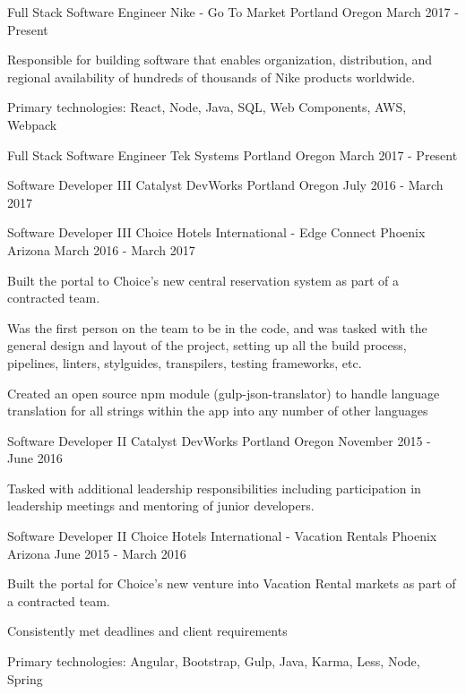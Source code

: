 
\begin{cventries}

  \cventry
  {Full Stack Software Engineer}
  {Nike - Go To Market}
  {Portland Oregon}
  {March 2017 - Present}
  {
    \begin{cvitems}
      \item {Responsible for building software that enables organization, distribution, and regional availability of hundreds of thousands of Nike products worldwide.}
      \item {Primary technologies: React, Node, Java, SQL, Web Components, AWS, Webpack}
    \end{cvitems}
  }

  \cventry
  {Full Stack Software Engineer}
  {Tek Systems}
  {Portland Oregon}
  {March 2017 - Present}
  {}

  \cventry
  {Software Developer III}
  {Catalyst DevWorks}
  {Portland Oregon}
  {July 2016 - March 2017}
  {}

  \cventry
    {Software Developer III}
    {Choice Hotels International - Edge Connect}
    {Phoenix Arizona}
    {March 2016 - March 2017}
    {
      \begin{cvitems}
        \item {Built the portal to Choice's new central reservation system as part of a contracted team.}
        \item {Was the first person on the team to be in the code, and was tasked with the general design and layout of the project, setting up all the build process, pipelines, linters, stylguides, transpilers, testing frameworks, etc.}
        \item {Created an open source npm module (gulp-json-translator) to handle language translation for all strings within the app into any number of other languages}
      \end{cvitems}
    }

  \cventry
    {Software Developer II}
    {Catalyst DevWorks}
    {Portland Oregon}
    {November 2015 - June 2016}
    {
      \begin{cvitems}
        \item {Tasked with additional leadership responsibilities including participation in leadership meetings and mentoring of junior developers.}
      \end{cvitems}
    }

  \cventry
    {Software Developer II}
    {Choice Hotels International - Vacation Rentals}
    {Phoenix Arizona}
    {June 2015 - March 2016}
    {
      \begin{cvitems}
        \item {Built the portal for Choice's new venture into Vacation Rental markets as part of a contracted team.}
        \item {Consistently met deadlines and client requirements}
        \item {Primary technologies: Angular, Bootstrap, Gulp, Java, Karma, Less, Node, Spring}
      \end{cvitems}
    }


\end{cventries}
